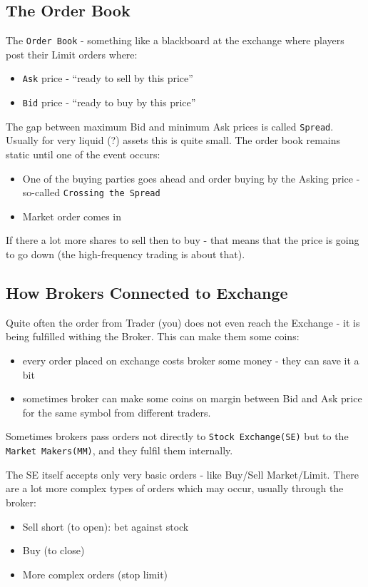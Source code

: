 \documentclass{scrartcl}
\newcommand{\term}[1]{\verb~#1~} %
\begin{document}
\subsection{The Order Book}
\label{sec:OrderBook}
The \term{Order Book} - something like a blackboard at the exchange where
players post their Limit orders where:
\begin{itemize}
\item \term{Ask} price - ``ready to sell by this price''
\item \term{Bid} price - ``ready to buy by this price''
\end{itemize}
The gap between maximum Bid and minimum Ask prices is called \term{Spread}.
Usually for very liquid (?) assets this is quite small.  
The order book remains static until one of the event occurs:
\begin{itemize}
\item One of the buying parties goes ahead and order buying by the Asking price
  - so-called \term{Crossing the Spread}
\item Market order comes in
\end{itemize}

If there a lot more shares to sell then to buy - that means that the price is
going to go down (the high-frequency trading is about that).

\subsection{How Brokers Connected to Exchange}
\label{sec:BrokerConnectionToExchange}

Quite often the order from Trader (you) does not even reach the Exchange - it is
being fulfilled withing the Broker. This can make them some coins:
\begin{itemize}
\item every order placed on exchange costs broker some money - they can save it
  a bit
\item sometimes broker can make some coins on margin between Bid and Ask price
  for the same symbol from different traders.
\end{itemize}

Sometimes brokers pass orders not directly to \term{Stock Exchange(SE)} but to
the \term{Market Makers(MM)}, and they fulfil them internally. 

The SE itself accepts only very basic orders - like Buy/Sell Market/Limit. There
are a lot more complex types of orders which may occur, usually through the
broker:
\begin{itemize}
\item Sell short (to open): bet against stock
\item Buy (to close)
\item More complex orders (stop limit)
\end{itemize}
\end{document}
